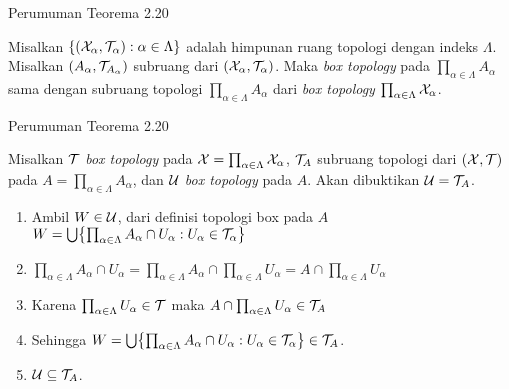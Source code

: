 \begin{frame}{Perumuman Teorema 2.20}
    \begin{tcolorbox}[enhanced,title=Teorema 2.36, frame style tile={width=\paperwidth}{\wallpaper}]
        Misalkan $\set*{\oio*{\nX_\alpha,\nT_\alpha}:\alpha \in \Lambda}$ adalah himpunan ruang topologi
        dengan indeks $\Lambda$. Misalkan $\oio*{A_\alpha,\nT_{A_\alpha}}$ subruang dari $\oio*{\nX_\alpha,\nT_\alpha}$.
        Maka \textit{box topology} pada $\prod_{\alpha \in \Lambda}A_\alpha$ sama dengan subruang topologi 
        $\prod_{\alpha \in \Lambda}A_\alpha$ dari \textit{box topology} $\prod_{\alpha \in \Lambda}\nX_\alpha$.
    \end{tcolorbox}
\end{frame}

\begin{frame}{Perumuman Teorema 2.20}
    \begin{tcolorbox}[enhanced,title=Teorema 2.36 (Bukti), frame style tile={width=\paperwidth}{\wallpaper}]
        Misalkan $\nT$ \textit{box topology} pada $\nX = \prod_{\alpha \in \Lambda}\nX_\alpha$, 
        $\nT_A$ subruang topologi dari $(\nX,\nT)$ pada $A = \prod_{\alpha \in \Lambda}A_\alpha$, dan 
        $\nU$ \textit{box topology} pada $A$. Akan dibuktikan $\nU = \nT_A$.
        \begin{enumerate}
            \item Ambil $W \in \nU$, dari definisi topologi box pada $A$
            $W=\bigcup\set*{\prod_{\alpha\in\Lambda} A_\alpha\cap U_\alpha : U_\alpha\in\nT_\alpha}$
            \item $\prod_{\alpha\in\Lambda} A_\alpha\cap U_\alpha=\prod_{\alpha\in\Lambda} A_\alpha\cap \prod_{\alpha\in\Lambda} U_\alpha= A\cap\prod_{\alpha\in\Lambda} U_\alpha$
            \item Karena $\prod_{\alpha\in\Lambda} U_\alpha\in\nT$ maka $A\cap\prod_{\alpha\in\Lambda} U_\alpha\in\nT_A$
            \item Sehingga $W=\bigcup\set*{\prod_{\alpha\in\Lambda} A_\alpha\cap U_\alpha : U_\alpha\in\nT_\alpha}\in\nT_A$.
            \item $\nU \subseteq \nT_A$.
        \end{enumerate}
    \end{tcolorbox}
\end{frame}

